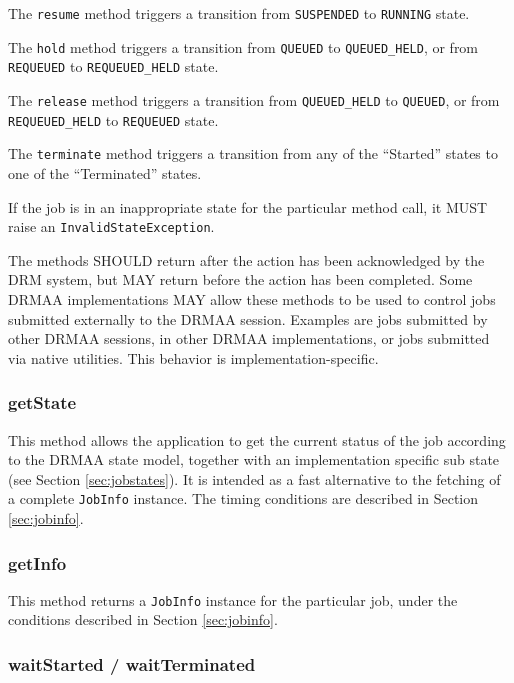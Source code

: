 \documentclass{article}
\newcommand{\h}[1]{\lstinline|#1|}
\newcommand{\rat}[1]{}
\begin{document}
The \h{resume} method triggers a transition from \h{SUSPENDED} to \h{RUNNING} state. 

The \h{hold} method triggers a transition from \h{QUEUED} to \h{QUEUED_HELD}, or from \h{REQUEUED} to \h{REQUEUED_HELD} state. 

The \h{release} method triggers a transition from \h{QUEUED_HELD} to \h{QUEUED}, or from \h{REQUEUED_HELD} to \h{REQUEUED} state. 

The \h{terminate} method triggers a transition from any of the \enquote{Started} states to one of the \enquote{Terminated} states. 

If the job is in an inappropriate state for the particular method call, it MUST raise an \h{InvalidStateException}.

The methods SHOULD return after the action has been acknowledged by the DRM system, but MAY return before the action has been completed. Some DRMAA implementations MAY allow these methods to be used to control jobs submitted externally to the DRMAA session. Examples are jobs submitted by other DRMAA sessions, in other DRMAA implementations, or jobs submitted via native utilities. This behavior is implementation-specific.

\subsubsection{getState}

This method allows the application to get the current status of the job according to the DRMAA state model, together with an implementation specific sub state (see Section \ref{sec:jobstates}). It is intended as a fast alternative to the fetching of a complete \h{JobInfo} instance. The timing conditions are described in Section \ref{sec:jobinfo}.

\rat{
The getState() function now also returns job subState information. This is intended as additional information for the given DRMAA job state, and can be used for expressing the hold state differentiation from DRMAA 1.0 (conf. call Mar 31st 2009).
}

\subsubsection{getInfo}

This method returns a \h{JobInfo} instance for the particular job, under the conditions described in Section \ref{sec:jobinfo}. 

\subsubsection{waitStarted / waitTerminated}
\end{document}
